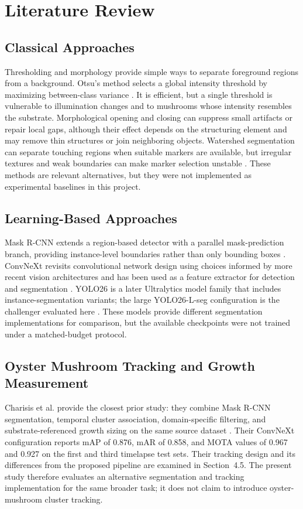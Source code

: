 \documentclass[11pt,a4paper]{article}
\begin{document}
\section{Literature Review}

\subsection{Classical Approaches}

Thresholding and morphology provide simple ways to separate foreground regions from a background. Otsu's method selects a global intensity threshold by maximizing between-class variance \cite{otsu}. It is efficient, but a single threshold is vulnerable to illumination changes and to mushrooms whose intensity resembles the substrate. Morphological opening and closing can suppress small artifacts or repair local gaps, although their effect depends on the structuring element and may remove thin structures or join neighboring objects. Watershed segmentation can separate touching regions when suitable markers are available, but irregular textures and weak boundaries can make marker selection unstable \cite{watershed}. These methods are relevant alternatives, but they were not implemented as experimental baselines in this project.

\subsection{Learning-Based Approaches}

Mask R-CNN extends a region-based detector with a parallel mask-prediction branch, providing instance-level boundaries rather than only bounding boxes \cite{maskrcnn}. ConvNeXt revisits convolutional network design using choices informed by more recent vision architectures and has been used as a feature extractor for detection and segmentation \cite{convnext}. YOLO26 is a later Ultralytics model family that includes instance-segmentation variants; the large YOLO26-L-seg configuration is the challenger evaluated here \cite{yolo26docs}. These models provide different segmentation implementations for comparison, but the available checkpoints were not trained under a matched-budget protocol.

\subsection{Oyster Mushroom Tracking and Growth Measurement}

Charisis et al. provide the closest prior study: they combine Mask R-CNN segmentation, temporal cluster association, domain-specific filtering, and substrate-referenced growth sizing on the same source dataset \cite{charisis}. Their ConvNeXt configuration reports mAP of 0.876, mAR of 0.858, and MOTA values of 0.967 and 0.927 on the first and third timelapse test sets. Their tracking design and its differences from the proposed pipeline are examined in Section~4.5. The present study therefore evaluates an alternative segmentation and tracking implementation for the same broader task; it does not claim to introduce oyster-mushroom cluster tracking.
\end{document}
